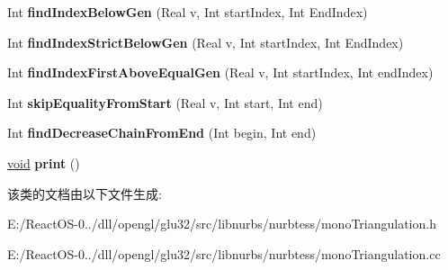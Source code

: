 \begin{DoxyCompactItemize}
$$Int {\bfseries find\+Index\+Below\+Gen} (Real v, Int start\+Index, Int End\+Index)
\item 
\mbox{\label{classvertex_array_a89357d5cee0ffa6ba33e8741a7d7bd52}} 
Int {\bfseries find\+Index\+Strict\+Below\+Gen} (Real v, Int start\+Index, Int End\+Index)
\item 
\mbox{\label{classvertex_array_a96569c12cfec8a86cd78807ce4598a76}} 
Int {\bfseries find\+Index\+First\+Above\+Equal\+Gen} (Real v, Int start\+Index, Int end\+Index)
\item 
\mbox{\label{classvertex_array_a947d0d466653ef62695af26b09b68f3f}} 
Int {\bfseries skip\+Equality\+From\+Start} (Real v, Int start, Int end)
\item 
\mbox{\label{classvertex_array_af57f73ace26e618ff3d092bd8fc4337f}} 
Int {\bfseries find\+Decrease\+Chain\+From\+End} (Int begin, Int end)
\item 
\mbox{\label{classvertex_array_ad6bd88cca7ada780ba69b042d91ac545}} 
\hyperlink{interfacevoid}{void} {\bfseries print} ()
\end{DoxyCompactItemize}


该类的文档由以下文件生成\+:\begin{DoxyCompactItemize}
\item 
E\+:/\+React\+O\+S-\/0../dll/opengl/glu32/src/libnurbs/nurbtess/mono\+Triangulation.\+h\item 
E\+:/\+React\+O\+S-\/0../dll/opengl/glu32/src/libnurbs/nurbtess/mono\+Triangulation.\+cc\end{DoxyCompactItemize}
